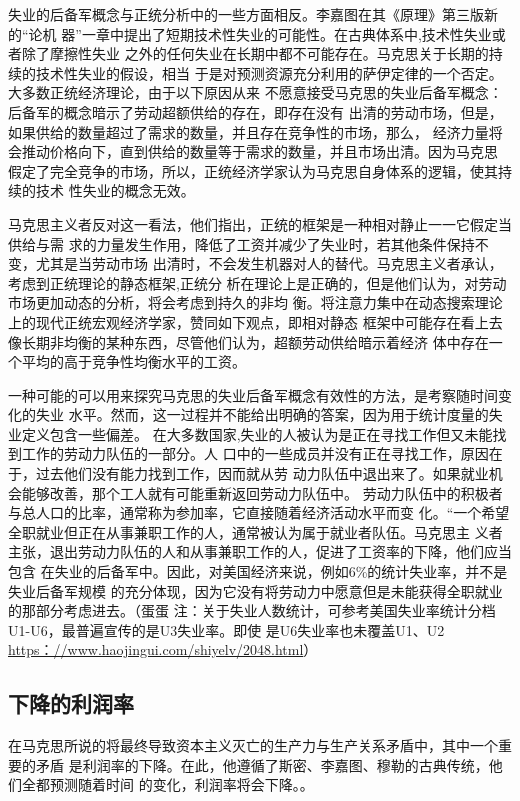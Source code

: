 失业的后备军概念与正统分析中的一些方面相反。李嘉图在其《原理》第三版新的“论机
器”一章中提出了短期技术性失业的可能性。在古典体系中,技术性失业或者除了摩擦性失业
之外的任何失业在长期中都不可能存在。马克思关于长期的持续的技术性失业的假设，相当
于是对预测资源充分利用的萨伊定律的一个否定。大多数正统经济理论，由于以下原因从来
不愿意接受马克思的失业后备军概念：后备军的概念暗示了劳动超额供给的存在，即存在没有
出清的劳动市场，但是，如果供给的数量超过了需求的数量，并且存在竞争性的市场，那么，
经济力量将会推动价格向下，直到供给的数量等于需求的数量，并且市场出清。因为马克思
假定了完全竞争的市场，所以，正统经济学家认为马克思自身体系的逻辑，使其持续的技术
性失业的概念无效。

马克思主义者反对这一看法，他们指出，正统的框架是一种相对静止一一它假定当供给与需
求的力量发生作用，降低了工资并减少了失业时，若其他条件保持不变，尤其是当劳动市场
出清时，不会发生机器对人的替代。马克思主义者承认，考虑到正统理论的静态框架,正统分
析在理论上是正确的，但是他们认为，对劳动市场更加动态的分析，将会考虑到持久的非均
衡。将注意力集中在动态搜索理论上的现代正统宏观经济学家，赞同如下观点，即相对静态
框架中可能存在看上去像长期非均衡的某种东西，尽管他们认为，超额劳动供给暗示着经济
体中存在一个平均的高于竞争性均衡水平的工资。

一种可能的可以用来探究马克思的失业后备军概念有效性的方法，是考察随时间变化的失业
水平。然而，这一过程并不能给出明确的答案，因为用于统计度量的失业定义包含一些偏差。
在大多数国家,失业的人被认为是正在寻找工作但又未能找到工作的劳动力队伍的一部分。人
口中的一些成员并没有正在寻找工作，原因在于，过去他们没有能力找到工作，因而就从劳
动力队伍中退出来了。如果就业机会能够改善，那个工人就有可能重新返回劳动力队伍中。
劳动力队伍中的积极者与总人口的比率，通常称为参加率，它直接随着经济活动水平而变
化。“一个希望全职就业但正在从事兼职工作的人，通常被认为属于就业者队伍。马克思主
义者主张，退出劳动力队伍的人和从事兼职工作的人，促进了工资率的下降，他们应当包含
在失业的后备军中。因此，对美国经济来说，例如6\%的统计失业率，并不是失业后备军规模
的充分体现，因为它没有将劳动力中愿意但是未能获得全职就业的那部分考虑进去。（蛋蛋
注：关于失业人数统计，可参考美国失业率统计分档U1-U6，最普遍宣传的是U3失业率。即使
是U6失业率也未覆盖U1、U2 \url{https：//www.haojingui.com/shiyelv/2048.html}）


\subsection{下降的利润率}

在马克思所说的将最终导致资本主义灭亡的生产力与生产关系矛盾中，其中一个重要的矛盾
是利润率的下降。在此，他遵循了斯密、李嘉图、穆勒的古典传统，他们全都预测随着时间
的变化，利润率将会下降。。

